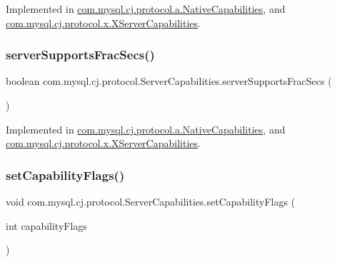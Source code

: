Implemented in \mbox{\hyperlink{classcom_1_1mysql_1_1cj_1_1protocol_1_1a_1_1_native_capabilities_a8c04f8697fc28a955b4d1aedf4b14ec8}{com.\+mysql.\+cj.\+protocol.\+a.\+Native\+Capabilities}}, and \mbox{\hyperlink{classcom_1_1mysql_1_1cj_1_1protocol_1_1x_1_1_x_server_capabilities_a05220b3f1dcfa896701c99b8f3d400c9}{com.\+mysql.\+cj.\+protocol.\+x.\+X\+Server\+Capabilities}}.

\mbox{\label{interfacecom_1_1mysql_1_1cj_1_1protocol_1_1_server_capabilities_aebc6a8a4326d4af70a1919bb99483524}} 
\subsubsection{\texorpdfstring{server\+Supports\+Frac\+Secs()}{serverSupportsFracSecs()}}
{\footnotesize\ttfamily boolean com.\+mysql.\+cj.\+protocol.\+Server\+Capabilities.\+server\+Supports\+Frac\+Secs (\begin{DoxyParamCaption}{ }\end{DoxyParamCaption})}



Implemented in \mbox{\hyperlink{classcom_1_1mysql_1_1cj_1_1protocol_1_1a_1_1_native_capabilities_af0128d4d52981bef0bab74ac88a57cb7}{com.\+mysql.\+cj.\+protocol.\+a.\+Native\+Capabilities}}, and \mbox{\hyperlink{classcom_1_1mysql_1_1cj_1_1protocol_1_1x_1_1_x_server_capabilities_a4b4c77a7eb2c156a57797a2b810be4e7}{com.\+mysql.\+cj.\+protocol.\+x.\+X\+Server\+Capabilities}}.

\mbox{\label{interfacecom_1_1mysql_1_1cj_1_1protocol_1_1_server_capabilities_ab5da8f1853ad82353d0446b785d98ee2}} 
\subsubsection{\texorpdfstring{set\+Capability\+Flags()}{setCapabilityFlags()}}
{\footnotesize\ttfamily void com.\+mysql.\+cj.\+protocol.\+Server\+Capabilities.\+set\+Capability\+Flags (\begin{DoxyParamCaption}\item[{int}]{capability\+Flags }\end{DoxyParamCaption})}



